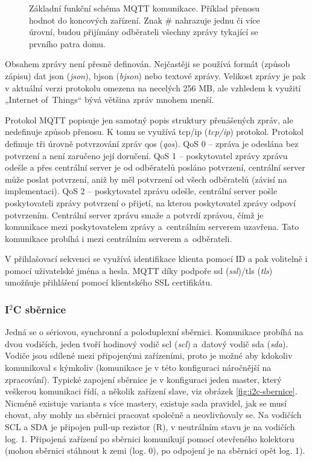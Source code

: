 \begin{figure}[H]
    \centering
    \def\svgwidth{\columnwidth}
    
    \caption[Základní funkční schéma MQTT komunikace.]{Základní funkční schéma MQTT komunikace. Příklad přenosu hodnot do koncových zařízení. Znak \# nahrazuje jednu či více úrovní, budou přijímány odběrateli všechny zprávy tykající se prvního patra domu.}
    \label{fig:mqtt-protokol}
\end{figure}

Obsahem zprávy není přesně definován. Nejčastěji se používá formát (způsob zápisu) dat \acrshort{json} (\textit{\acrlong{json}}), \acrshort{bjson} (\textit{\acrlong{bjson}}) nebo textové zprávy. Velikost zprávy je pak v aktuální verzi protokolu omezena na necelých 256 MB, ale vzhledem k využití „Internet of~Things“ bývá většina zpráv mnohem menší.

Protokol MQTT popisuje jen samotný popis struktury přenášených zpráv, ale nedefinuje způsob přenosu. K tomu se využívá \acrshort{tcp/ip} (\textit{\acrlong{tcp/ip}}) protokol. Protokol definuje tři úrovně potvrzování zpráv \acrshort{qos} (\textit{\acrlong{qos}}). QoS 0 – zpráva je odeslána bez potvrzení a není zaručeno její doručení. QoS 1 – poskytovatel zprávy zprávu odešle a přes centrální server je od odběratelů posláno potvrzení, centrální server může poslat potvrzení, aniž by měl potvrzení od všech odběratelů (závisí na implementaci). QoS 2 – poskytovatel zprávu odešle, centrální server pošle poskytovateli zprávy potvrzení o přijetí, na kterou poskytovatel zprávy odpoví potvrzením. Centrální server zprávu smaže a potvrdí zprávou, čímž je komunikace mezi poskytovatelem zprávy a~centrálním serverem uzavřena. Tato komunikace probíhá i mezi centrálním serverem a~odběrateli.


V přihlašovací sekvenci se využívá identifikace klienta pomocí ID a pak volitelně i pomocí uživatelské jména a hesla. MQTT díky podpoře \acrshort{ssl} (\textit{\acrlong{ssl}})/\acrshort{tls} (\textit{\acrlong{tls}}) umožňuje přihlášení pomocí klientského SSL certifikátu.
\setnowidow[2]
\subsubsection{I$^2$C sběrnice}
Jedná se o sériovou, synchronní a poloduplexní sběrnici. Komunikace probíhá na dvou vodičích, jeden tvoří hodinový vodič \acrshort{scl} (\textit{\acrlong{scl}}) a~datový vodič \acrshort{sda} (\textit{\acrlong{sda}}). Vodiče jsou sdílené mezi připojenými zařízeními, proto je možné aby kdokoliv komunikoval s kýmkoliv (komunikace je v této konfiguraci náročnější na zpracování). Typické zapojení sběrnice je v konfiguraci jeden master, který veškerou komunikaci řídí, a několik zařízení slave, viz obrázek \ref{fig:i2c-sbernice}. Nicméně existuje varianta s více mastery, existuje sada pravidel, jak se musí chovat, aby mohly na sběrnici pracovat společně a neovlivňovaly se. Na vodičích SCL a SDA je připojen pull-up rezistor (R), v neutrálním stavu je na vodičích log. 1. Připojená zařízení po sběrnici komunikují pomocí otevřeného kolektoru (mohou sběrnici stáhnout k zemi (log. 0), po odpojení je na sběrnici opět log. 1).

